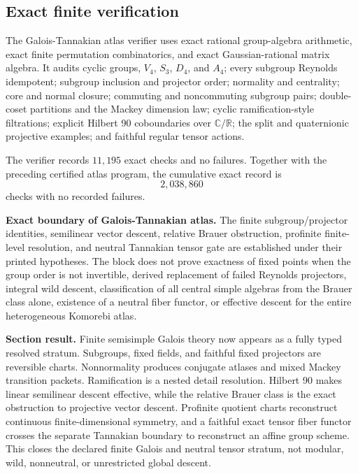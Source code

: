\subsection{Exact finite verification}
\label{subsec:block12-verification}

The Galois-Tannakian atlas verifier uses exact rational group-algebra arithmetic, exact finite permutation combinatorics, and exact Gaussian-rational matrix algebra.  It audits cyclic groups, \(V_4\), \(S_3\), \(D_4\), and \(A_4\); every subgroup Reynolds idempotent; subgroup inclusion and projector order; normality and centrality; core and normal closure; commuting and noncommuting subgroup pairs; double-coset partitions and the Mackey dimension law; cyclic ramification-style filtrations; explicit Hilbert 90 coboundaries over \(\mathbb C/\mathbb R\); the split and quaternionic projective examples; and faithful regular tensor actions.



The verifier records \(11{,}195\) exact checks and no failures.  Together with the preceding certified atlas program, the cumulative exact record is
\[
 \boxed{2{,}038{,}860}
\]
checks with no recorded failures.

\begin{boundarybox}
\textbf{Exact boundary of Galois-Tannakian atlas.}
The finite subgroup/projector identities, semilinear vector descent, relative Brauer obstruction, profinite finite-level resolution, and neutral Tannakian tensor gate are established under their printed hypotheses.  The block does not prove exactness of fixed points when the group order is not invertible, derived replacement of failed Reynolds projectors, integral wild descent, classification of all central simple algebras from the Brauer class alone, existence of a neutral fiber functor, or effective descent for the entire heterogeneous Komorebi atlas.
\end{boundarybox}

\begin{resultbox}
\textbf{Section result.}
Finite semisimple Galois theory now appears as a fully typed resolved stratum.  Subgroups, fixed fields, and faithful fixed projectors are reversible charts.  Nonnormality produces conjugate atlases and mixed Mackey transition packets.  Ramification is a nested detail resolution.  Hilbert 90 makes linear semilinear descent effective, while the relative Brauer class is the exact obstruction to projective vector descent.  Profinite quotient charts reconstruct continuous finite-dimensional symmetry, and a faithful exact tensor fiber functor crosses the separate Tannakian boundary to reconstruct an affine group scheme.  This closes the declared finite Galois and neutral tensor stratum, not modular, wild, nonneutral, or unrestricted global descent.
\end{resultbox}

